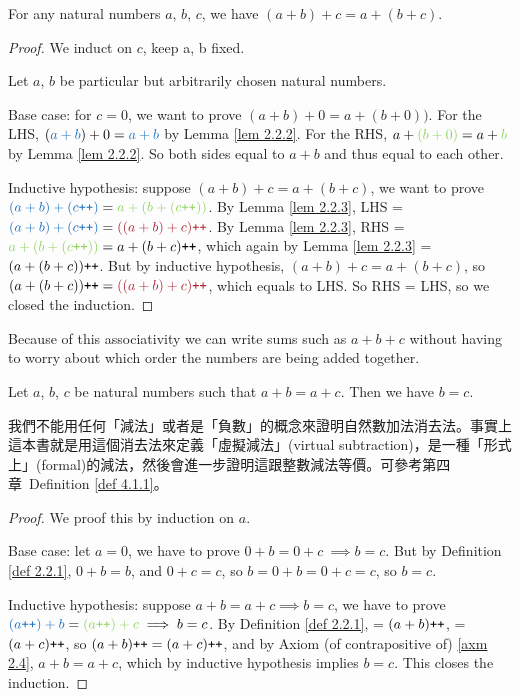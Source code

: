 \begin{proposition}\label{prop 2.2.5} For any natural numbers \(a\), \(b\), \(c\), we have \((a + b) + c = a + (b + c)\).
\end{proposition}
\begin{proof}
We induct on \(c\), keep a, b fixed.

Let \(a\), \(b\) be particular but arbitrarily chosen natural numbers.

Base case: for \(c = 0\), we want to prove \((a + b) + 0 = a + (b + 0))\). For the LHS, \((\BLUE{a + b}) + 0 = \BLUE{a + b}\) by Lemma \ref{lem 2.2.2}. For the RHS, \(a + \GREEN{(b + 0)} = a + \GREEN{b}\) by Lemma \ref{lem 2.2.2}. So both sides equal to \(a + b\) and thus equal to each other.

Inductive hypothesis: suppose \((a + b) + c = a + (b + c)\), we want to prove \(\BLUE{(a + b) + (c\INC)} = \GREEN{a + (b + (c\INC))}\). By Lemma \ref{lem 2.2.3}, LHS = \(\BLUE{(a + b) + (c\INC)} = \MAROON{((a + b) + c)\INC}\). By Lemma \ref{lem 2.2.3}, RHS = \(\GREEN{a + (b + (c\INC))} = a + (b + c)\INC\), which again by Lemma \ref{lem 2.2.3} = \((a + (b + c))\texttt{++}\). But by inductive hypothesis, \((a + b) + c = a + (b + c)\), so \((a + (b + c))\INC = \MAROON{((a + b) + c)\INC}\), which equals to LHS. So RHS = LHS, so we closed the induction.
\end{proof}

\begin{note}
Because of this associativity we can write sums such as \(a + b + c\) without having to worry about which order the numbers are being added together.
\end{note}

\begin{proposition}\label{prop 2.2.6} Let \(a\), \(b\), \(c\) be natural numbers such that \(a + b = a + c\). Then we have \(b = c\).
\end{proposition}
\begin{note}
我們不能用任何「減法」或者是「負數」的概念來證明自然數加法消去法。事實上這本書就是用這個消去法來定義「虛擬減法」(virtual subtraction)，是一種「形式上」(formal)的減法，然後會進一步證明這跟整數減法等價。可參考第四章\ Definition \ref{def 4.1.1}。
\end{note}
\begin{proof}
We proof this by induction on \(a\).

Base case: let \(a = 0\), we have to prove \(0 + b = 0 + c\ \implies b = c\). But by Definition \ref{def 2.2.1}, \(0 + b = b\), and \(0 + c = c\), so \(b = 0 + b = 0 + c = c\), so \(b = c\).

Inductive hypothesis: suppose \(a + b = a + c \implies b = c\), we have to prove \(\BLUE{(a\INC) + b} = \GREEN{(a\INC) + c} \implies b = c\). By Definition \ref{def 2.2.1},  = \((a + b)\texttt{++}\),  = \((a + c)\texttt{++}\), so \((a + b)\texttt{++} = (a + c)\texttt{++}\), and by Axiom (of contrapositive of) \ref{axm 2.4}, \(a + b = a + c\), which by inductive hypothesis implies \(b = c\). This closes the induction.
\end{proof}

